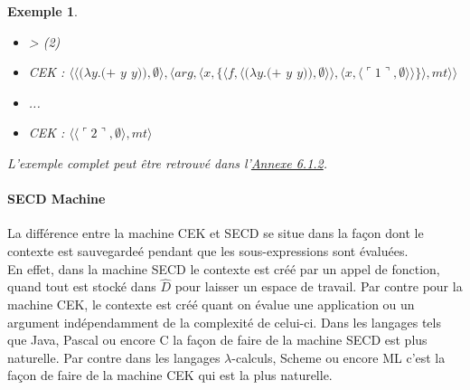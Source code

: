 \documentclass[10pt,a4paper]{report}
\newtheorem{ex}{Exemple}
\begin{document}
\begin{ex}
\begin{itemize}
		\item[] > (2) 
		\item[] CEK : $\langle\langle(\lambda y.(+$ $y$ $y)),\emptyset\rangle,\langle arg,\langle x,\{\langle f,\langle(\lambda y.(+$ $y$ $y)),\emptyset\rangle\rangle,\langle x,\langle\ulcorner 1\urcorner,\emptyset\rangle\rangle\}\rangle,mt\rangle\rangle$
		\item[] ...
		\item[] CEK : $\langle\langle\ulcorner 2\urcorner,\emptyset\rangle,mt\rangle$
	\end{itemize}
	\medbreak
	
	L'exemple complet peut être retrouvé dans l'\hyperref[CEK]{Annexe 6.1.2}.
\end{ex}
\bigbreak


\paragraph{SECD Machine}

La différence entre la machine CEK et SECD se situe dans la façon dont le contexte est sauvegardeé pendant que les sous-expressions sont évaluées.\\
En effet, dans la machine SECD le contexte est créé par un appel de fonction, quand tout est stocké dans $\widehat{D}$ pour laisser un espace de travail. Par contre pour la machine CEK, le contexte est créé quant on évalue une application ou un argument indépendamment de la complexité de celui-ci.
\smallbreak 
Dans les langages tels que Java, Pascal ou encore C la façon de faire de la machine SECD est plus naturelle. Par contre  dans les langages $\lambda$-calculs, Scheme ou encore ML c'est la façon de faire de la machine CEK qui est la plus naturelle.
\medbreak
\end{document}
